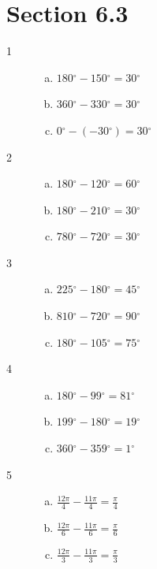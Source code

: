 \documentclass{exam}
\newcommand{\dg}{\ensuremath{^\circ}}
\begin{document}
  \ifprintanswers

  \pagebreak

    \section{Section 6.3}

    \begin{description}

      \item[1] 
        \begin{enumerate}[(a)]
          \item $180 \dg - 150 \dg = \boxed{ 30 \dg }$
          \item $360 \dg - 330 \dg = \boxed{ 30 \dg }$
          \item $0 \dg - (-30 \dg) = \boxed{ 30 \dg }$
        \end{enumerate}

      \item[2] 
        \begin{enumerate}[(a)]
          \item $180 \dg - 120 \dg = \boxed{ 60 \dg }$
          \item $180 \dg - 210 \dg = \boxed{ 30 \dg }$
          \item $780 \dg - 720 \dg = \boxed{ 30 \dg }$
        \end{enumerate}

      \item[3] 
        \begin{enumerate}[(a)]
          \item $225 \dg - 180 \dg = \boxed{ 45 \dg }$
          \item $810 \dg - 720 \dg = \boxed{ 90 \dg }$
          \item $180 \dg - 105 \dg = \boxed{ 75 \dg }$
        \end{enumerate}

      \item[4] 
        \begin{enumerate}[(a)]
          \item $180 \dg - 99 \dg = \boxed{ 81 \dg }$
          \item $199 \dg - 180 \dg = \boxed{ 19 \dg }$
          \item $360 \dg - 359 \dg = \boxed{ 1 \dg }$
        \end{enumerate}

      \item[5] 
        \begin{enumerate}[(a)]
          \item $\frac{12 \pi}{4} - \frac{11 \pi}{4} = \boxed{ \frac{\pi}{4} }$
          \item $\frac{12 \pi}{6} - \frac{11 \pi}{6} = \boxed{ \frac{\pi}{6} }$
          \item $\frac{12 \pi}{3} - \frac{11 \pi}{3} = \boxed{ \frac{\pi}{3} }$
        \end{enumerate}


\end{description}
\end{document}

